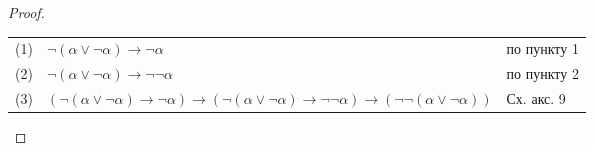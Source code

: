 \begin{proof}
\begin{enumerate}
\begin{tabular}{lll}
(1) & $\neg(\alpha\vee\neg\alpha) \rightarrow \neg\alpha$ & по пункту 1\\
(2) & $\neg(\alpha\vee\neg\alpha) \rightarrow \neg\neg\alpha$& по пункту 2\\
(3) & $(\neg(\alpha\vee\neg\alpha) \rightarrow \neg\alpha) \rightarrow (\neg(\alpha\vee\neg\alpha) \rightarrow \neg\neg\alpha) \rightarrow (\neg\neg(\alpha\vee\neg\alpha))$ & Сх. акс. 9\\

\end{tabular}
\end{enumerate}
\end{proof}

